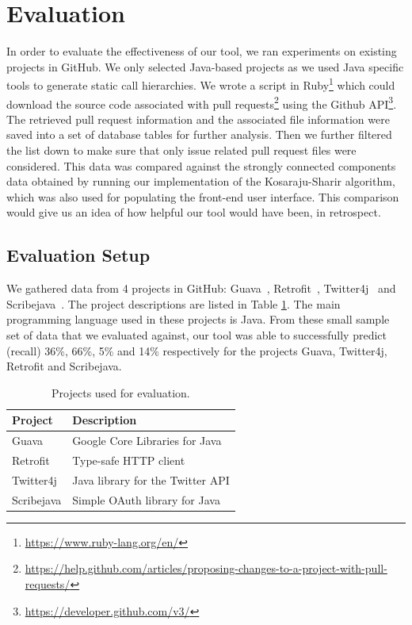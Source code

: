 
\section{Evaluation}
\label{sec:finding}

In order to evaluate the effectiveness of our tool, we ran experiments on existing projects in GitHub. We only selected Java-based projects as we used Java specific tools to generate static call hierarchies. We wrote a script in Ruby\footnote{\url{https://www.ruby-lang.org/en/}} which could download the source code associated with pull requests\footnote{\url{https://help.github.com/articles/proposing-changes-to-a-project-with-pull-requests/}} using the Github API\footnote{\url{https://developer.github.com/v3/}}. The retrieved pull request information and the associated file information were saved into a set of database tables for further analysis. Then we further filtered the list down to make sure that only issue related pull request files were considered. This data was compared against the strongly connected components data obtained by running our implementation of the Kosaraju-Sharir algorithm, which was also used for populating the front-end user interface. This comparison would give us an idea of how helpful our tool would have been, in retrospect. 

\subsection{Evaluation Setup}

We gathered data from 4 projects in GitHub: Guava~\cite{guava}, Retrofit~\cite{retrofit}, Twitter4j~\cite{twitter4j} and Scribejava~\cite{scribejava}. The project descriptions are listed in Table \ref{tab:evaluationprojects}. The main programming language used in these projects is Java. From these small sample set of data that we evaluated against, our tool was able to successfully predict (recall) 36\%, 66\%, 5\% and 14\% respectively for the projects Guava, Twitter4j, Retrofit and Scribejava. 

\begin{table}[h]
\centering
\begin{tabular}{ll}
\hline
Project & Description \\
\hline
Guava & Google Core Libraries for Java \\
Retrofit & Type-safe HTTP client \\
Twitter4j & Java library for the Twitter API \\
Scribejava & Simple OAuth library for Java \\
\hline
\end{tabular}
\caption{Projects used for evaluation.}
\label{tab:evaluationprojects}
\end{table}

